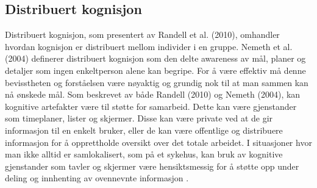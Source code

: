 \subsection{Distribuert kognisjon}
\label{DistKogn}
Distribuert kognisjon, som presentert av Randell et al. (2010), omhandler hvordan kognisjon er distribuert mellom individer i en gruppe. Nemeth et al. (2004) definerer distribuert kognisjon som den delte awareness av mål, planer og detaljer som ingen enkeltperson alene kan begripe. For å være effektiv må denne bevisstheten og forståelsen være nøyaktig og grundig nok til at man sammen kan nå ønskede mål. Som beskrevet av både Randell (2010) og Nemeth (2004), kan kognitive artefakter være til støtte for samarbeid. Dette kan være gjenstander som timeplaner, lister og skjermer. Disse kan være private ved at de gir informasjon til en enkelt bruker, eller de kan være offentlige og distribuere informasjon for å opprettholde oversikt over det totale arbeidet. I situasjoner hvor man ikke alltid er samlokalisert, som på et sykehus, kan bruk av kognitive gjenstander som tavler og skjermer være hensiktsmessig for å støtte opp under deling og innhenting av ovennevnte informasjon \cite{Bardram04, Nemeth04}.



